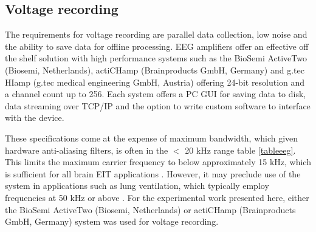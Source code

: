\subsection{Voltage recording}
The requirements for voltage recording are parallel data collection, low noise and the ability to save data for offline processing. EEG amplifiers offer an effective off the shelf solution with high performance systems such as the BioSemi ActiveTwo (Biosemi, Netherlands), actiCHamp (Brainproducts GmbH, Germany) and g.tec HIamp (g.tec medical engineering GmbH, Austria) offering 24-bit resolution and a channel count up to 256. Each system offers a PC GUI for saving data to disk, data streaming over TCP/IP and the option to write custom software to interface with the device. 

These specifications come at the expense of maximum bandwidth, which given hardware anti-aliasing filters, is often in the $<$ 20 kHz range table \ref{tableeeg}. This limits the maximum carrier frequency to below approximately 15 kHz, which is sufficient for all brain EIT applications \label{table_requirements}. However, it may preclude use of the system in applications such as lung ventilation, which typically employ frequencies at 50 kHz or above \cite{Frerichs_2000}. For the experimental work presented here, either the BioSemi ActiveTwo (Biosemi, Netherlands) or actiCHamp (Brainproducts GmbH, Germany) system was used for voltage recording. 
